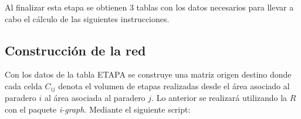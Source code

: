 \documentclass[12pt]{article}
\begin{document}
Al finalizar esta etapa se obtienen 3 tablas con los datos necesarios para llevar a cabo el cálculo de las siguientes instrucciones.

	\subsection{Construcción de la red}
	
Con los datos de la tabla ETAPA se construye una matriz origen destino donde cada celda $C_{ij}$ denota el volumen de etapas realizadas desde el área asociado al paradero $i$ al área asociada al paradero $j$. Lo anterior se realizará utilizando la $R$ con el paquete \textit{i-graph}. Mediante el siguiente script:


	
		
	
	
	
\end{document}
